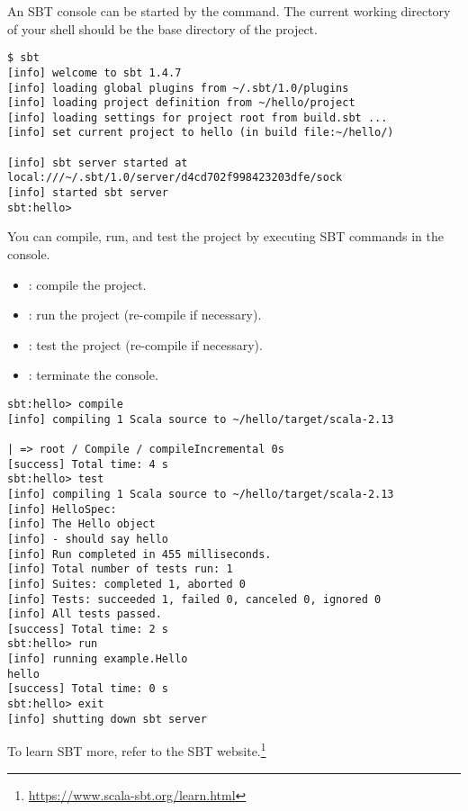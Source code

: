An SBT console can be started by the  command. The current working
directory of your shell should be the base directory of the project.

\begin{verbatim}
$ sbt
[info] welcome to sbt 1.4.7
[info] loading global plugins from ~/.sbt/1.0/plugins
[info] loading project definition from ~/hello/project
[info] loading settings for project root from build.sbt ...
[info] set current project to hello (in build file:~/hello/)

[info] sbt server started at
local:///~/.sbt/1.0/server/d4cd702f998423203dfe/sock
[info] started sbt server
sbt:hello>
\end{verbatim}

You can compile, run, and test the project by executing SBT commands in the
console.

\begin{itemize}
  \item {}: compile the project.
  \item {}: run the project (re-compile if necessary).
  \item {}: test the project (re-compile if necessary).
  \item {}: terminate the console.
\end{itemize}

\begin{verbatim}
sbt:hello> compile
[info] compiling 1 Scala source to ~/hello/target/scala-2.13

| => root / Compile / compileIncremental 0s
[success] Total time: 4 s
sbt:hello> test
[info] compiling 1 Scala source to ~/hello/target/scala-2.13
[info] HelloSpec:
[info] The Hello object
[info] - should say hello
[info] Run completed in 455 milliseconds.
[info] Total number of tests run: 1
[info] Suites: completed 1, aborted 0
[info] Tests: succeeded 1, failed 0, canceled 0, ignored 0
[info] All tests passed.
[success] Total time: 2 s
sbt:hello> run
[info] running example.Hello
hello
[success] Total time: 0 s
sbt:hello> exit
[info] shutting down sbt server
\end{verbatim}

To learn SBT more, refer to the SBT website.\footnote{\url{https://www.scala-sbt.org/learn.html}}
